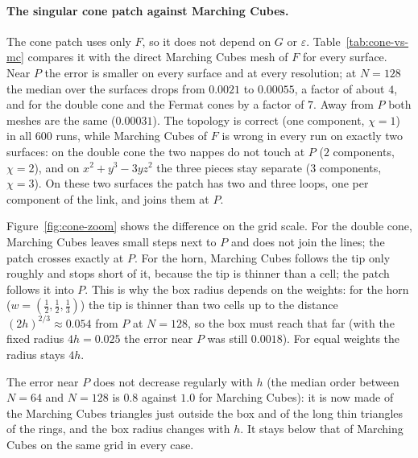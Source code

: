 \documentclass[12pt, a4paper]{article}
\theoremstyle{plain}
\theoremstyle{definition}
\theoremstyle{remark}
\theoremstyle{definition}
\begin{document}
\paragraph{The singular cone patch against Marching Cubes.} The cone patch uses only
$F$, so it does not depend on $G$ or $\varepsilon$. Table~\ref{tab:cone-vs-mc}
compares it with the direct Marching Cubes mesh of $F$ for every surface. Near $P$
the error is smaller on every surface and at every resolution; at $N=128$ the median
over the surfaces drops from $0.0021$ to $0.00055$, a factor of about $4$, and for the
double cone and the Fermat cones by a factor of $7$. Away from $P$ both meshes are the
same ($0.00031$). The topology is correct (one component, $\chi=1$) in all $600$
runs, while Marching Cubes of $F$ is wrong in every run on exactly two surfaces: on
the double cone the two nappes do not touch at $P$ ($2$ components, $\chi=2$), and
on $x^2+y^3-3yz^2$ the three pieces stay separate ($3$ components, $\chi=3$). On
these two surfaces the patch has two and three loops, one per component of the
link, and joins them at $P$.

Figure~\ref{fig:cone-zoom} shows the difference on the grid scale. For the double
cone, Marching Cubes leaves small steps next to $P$ and does not join the lines; the
patch crosses exactly at $P$. For the horn, Marching Cubes follows the tip only
roughly and stops short of it, because the tip is thinner than a cell; the patch
follows it into $P$. This is why the box radius depends on the weights: for the horn
($w=(\tfrac12,\tfrac12,\tfrac13)$) the tip is thinner than two cells up to the distance
$(2h)^{2/3}\approx0.054$ from $P$ at $N=128$, so the box must reach that far (with the
fixed radius $4h=0.025$ the error near $P$ was still $0.0018$). For equal weights
the radius stays $4h$.

The error near $P$ does not decrease regularly with $h$ (the median order between
$N=64$ and $N=128$ is $0.8$ against $1.0$ for Marching Cubes): it is now made of the
Marching Cubes triangles just outside the box and of the long thin triangles of the
rings, and the box radius changes with $h$. It stays below that of Marching Cubes on
the same grid in every case.
\end{document}
